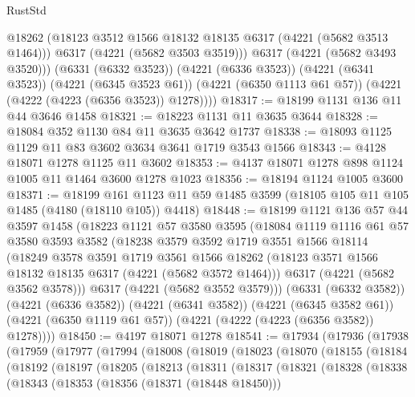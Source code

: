 \begin{lexlean}{RustStd}
\begin{coremodule}
            @18262
            (@18123 @3512 @1566 @18132 @18135 @6317 (@4221 (@5682 @3513 @1464)))
            @6317
            (@4221 (@5682 @3503 @3519)))
          @6317
          (@4221 (@5682 @3493 @3520)))
        (@6331 (@6332 @3523))
        (@4221 (@6336 @3523))
        (@4221 (@6341 @3523))
        (@4221 (@6345 @3523 @61))
        (@4221 (@6350 @1113 @61 @57))
        (@4221 (@4222 (@4223 (@6356 @3523)) @1278))))
@18317 := @18199 @1131 @136 @11 @44 @3646 @1458
@18321 := @18223 @1131 @11 @3635 @3644
@18328 := @18084 @352 @1130 @84 @11 @3635 @3642 @1737
@18338 := @18093 @1125 @1129 @11 @83 @3602 @3634 @3641 @1719 @3543 @1566
@18343 := @4128 @18071 @1278 @1125 @11 @3602
@18353 := @4137 @18071 @1278 @898 @1124 @1005 @11 @1464 @3600 @1278 @1023
@18356 := @18194 @1124 @1005 @3600
@18371 := @18199
    @161
    @1123
    @11
    @59
    @1485
    @3599
    (@18105 @105 @11 @105 @1485 (@4180 (@18110 @105)) @4418)
@18448 := @18199
    @1121
    @136
    @57
    @44
    @3597
    @1458
    (@18223
      @1121
      @57
      @3580
      @3595
      (@18084
        @1119
        @1116
        @61
        @57
        @3580
        @3593
        @3582
        (@18238
          @3579
          @3592
          @1719
          @3551
          @1566
          @18114
          (@18249
            @3578
            @3591
            @1719
            @3561
            @1566
            @18262
            (@18123 @3571 @1566 @18132 @18135 @6317 (@4221 (@5682 @3572 @1464)))
            @6317
            (@4221 (@5682 @3562 @3578)))
          @6317
          (@4221 (@5682 @3552 @3579)))
        (@6331 (@6332 @3582))
        (@4221 (@6336 @3582))
        (@4221 (@6341 @3582))
        (@4221 (@6345 @3582 @61))
        (@4221 (@6350 @1119 @61 @57))
        (@4221 (@4222 (@4223 (@6356 @3582)) @1278))))
@18450 := @4197 @18071 @1278
@18541 := @17934
    (@17936
      (@17938
        (@17959
          (@17977
            (@17994
              (@18008
                (@18019
                  (@18023
                    (@18070
                      (@18155
                        (@18184
                          (@18192
                            (@18197
                              (@18205
                                (@18213
                                  (@18311
                                    (@18317
                                      (@18321
                                        (@18328
                                          (@18338
                                            (@18343
                                              (@18353
                                                (@18356 (@18371 (@18448 @18450)))

\end{coremodule}
\end{lexlean}
